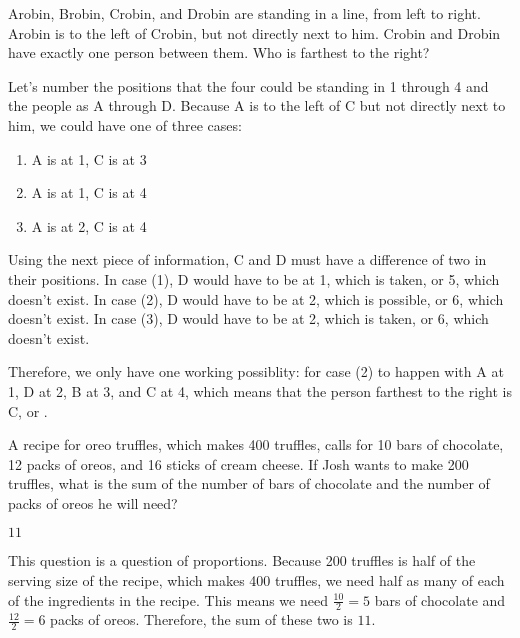 \documentclass[11pt]{article}
\begin{document}
\begin{problem} %
Arobin, Brobin, Crobin, and Drobin are standing in a line, from left to right. Arobin is to the left of Crobin, but not directly next to him. Crobin and Drobin have exactly one person between them. Who is farthest to the right?
\end{problem}
\begin{answer}
\end{answer}
\begin{solution}
Let's number the positions that the four could be standing in 1 through 4 and the people as A through D. Because A is to the left of C but not directly next to him, we could have one of three cases:

\begin{enumerate}
\item A is at 1, C is at 3
\item A is at 1, C is at 4
\item A is at 2, C is at 4
\end{enumerate}

Using the next piece of information, C and D must have a difference of two in their positions. In case (1), D would have to be at 1, which is taken, or 5, which doesn't exist. In case (2), D would have to be at 2, which is possible, or 6, which doesn't exist. In case (3), D would have to be at 2, which is taken, or 6, which doesn't exist. 

Therefore, we only have one working possiblity: for case (2) to happen with A at 1, D at 2, B at 3, and C at 4, which means that the person farthest to the right is C, or .
\end{solution}

\begin{problem} %
A recipe for oreo truffles, which makes 400 truffles, calls for 10 bars of chocolate, 12 packs of oreos, and 16 sticks of cream cheese. If Josh wants to make 200 truffles, what is the sum of the number of bars of chocolate and the number of packs of oreos he will need?
\end{problem}
\begin{answer}
$\boxed{11}$
\end{answer}
\begin{solution}This question is a question of proportions. Because 200 truffles is half of the serving size of the recipe, which makes 400 truffles, we need half as many of each of the ingredients in the recipe. This means we need $\frac{10}{2} = 5$ bars of chocolate and $\frac{12}{2} = 6$ packs of oreos. Therefore, the sum of these two is $\boxed{11}$.
\end{solution}
\end{document}
